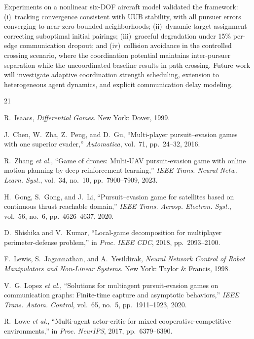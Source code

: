 \documentclass[conference]{IEEEtran}
\begin{document}
Experiments on a nonlinear six-DOF aircraft model validated the framework: (i)~tracking convergence consistent with UUB stability, with all pursuer errors converging to near-zero bounded neighborhoods; (ii)~dynamic target assignment correcting suboptimal initial pairings; (iii)~graceful degradation under 15\% per-edge communication dropout; and (iv)~collision avoidance in the controlled crossing scenario, where the coordination potential maintains inter-pursuer separation while the uncoordinated baseline results in path crossing. Future work will investigate adaptive coordination strength scheduling, extension to heterogeneous agent dynamics, and explicit communication delay modeling.


\begin{thebibliography}{21}

R.~Isaacs, \emph{Differential Games}. New York: Dover, 1999.

J.~Chen, W.~Zha, Z.~Peng, and D.~Gu, ``Multi-player pursuit--evasion games with one superior evader,'' \emph{Automatica}, vol.~71, pp.~24--32, 2016.

R.~Zhang \emph{et al.}, ``Game of drones: Multi-UAV pursuit-evasion game with online motion planning by deep reinforcement learning,'' \emph{IEEE Trans. Neural Netw. Learn. Syst.}, vol.~34, no.~10, pp.~7900--7909, 2023.

H.~Gong, S.~Gong, and J.~Li, ``Pursuit--evasion game for satellites based on continuous thrust reachable domain,'' \emph{IEEE Trans. Aerosp. Electron. Syst.}, vol.~56, no.~6, pp.~4626--4637, 2020.

D.~Shishika and V.~Kumar, ``Local-game decomposition for multiplayer perimeter-defense problem,'' in \emph{Proc. IEEE CDC}, 2018, pp.~2093--2100.

F.~Lewis, S.~Jagannathan, and A.~Yesildirak, \emph{Neural Network Control of Robot Manipulators and Non-Linear Systems}. New York: Taylor \& Francis, 1998.

V.~G. Lopez \emph{et al.}, ``Solutions for multiagent pursuit-evasion games on communication graphs: Finite-time capture and asymptotic behaviors,'' \emph{IEEE Trans. Autom. Control}, vol.~65, no.~5, pp.~1911--1923, 2020.

R.~Lowe \emph{et al.}, ``Multi-agent actor-critic for mixed cooperative-competitive environments,'' in \emph{Proc. NeurIPS}, 2017, pp.~6379--6390.


\end{thebibliography}
\end{document}
